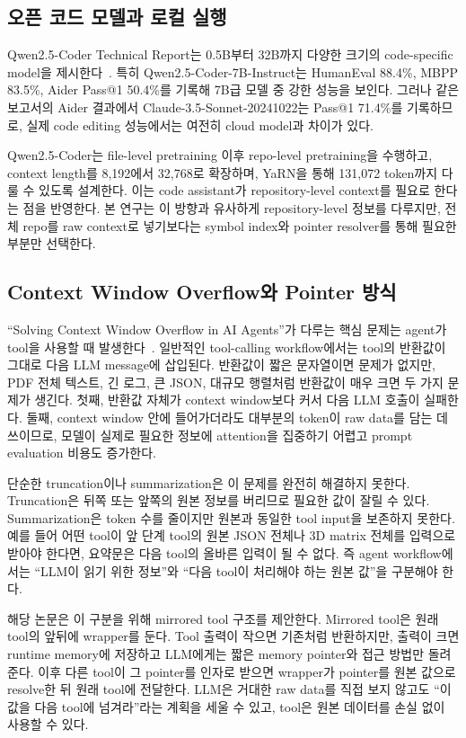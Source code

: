 \documentclass[11pt,a4paper]{article}
\begin{document}
\subsection{오픈 코드 모델과 로컬 실행}

Qwen2.5-Coder Technical Report는 0.5B부터 32B까지 다양한 크기의 code-specific model을 제시한다~\cite{hui2024qwen25coder}. 특히 Qwen2.5-Coder-7B-Instruct는 HumanEval 88.4\%, MBPP 83.5\%, Aider Pass@1 50.4\%를 기록해 7B급 모델 중 강한 성능을 보인다. 그러나 같은 보고서의 Aider 결과에서 Claude-3.5-Sonnet-20241022는 Pass@1 71.4\%를 기록하므로, 실제 code editing 성능에서는 여전히 cloud model과 차이가 있다.

Qwen2.5-Coder는 file-level pretraining 이후 repo-level pretraining을 수행하고, context length를 8,192에서 32,768로 확장하며, YaRN을 통해 131,072 token까지 다룰 수 있도록 설계한다. 이는 code assistant가 repository-level context를 필요로 한다는 점을 반영한다. 본 연구는 이 방향과 유사하게 repository-level 정보를 다루지만, 전체 repo를 raw context로 넣기보다는 symbol index와 pointer resolver를 통해 필요한 부분만 선택한다.

\subsection{Context Window Overflow와 Pointer 방식}

``Solving Context Window Overflow in AI Agents''가 다루는 핵심 문제는 agent가 tool을 사용할 때 발생한다~\cite{labate2025contextoverflow}. 일반적인 tool-calling workflow에서는 tool의 반환값이 그대로 다음 LLM message에 삽입된다. 반환값이 짧은 문자열이면 문제가 없지만, PDF 전체 텍스트, 긴 로그, 큰 JSON, 대규모 행렬처럼 반환값이 매우 크면 두 가지 문제가 생긴다. 첫째, 반환값 자체가 context window보다 커서 다음 LLM 호출이 실패한다. 둘째, context window 안에 들어가더라도 대부분의 token이 raw data를 담는 데 쓰이므로, 모델이 실제로 필요한 정보에 attention을 집중하기 어렵고 prompt evaluation 비용도 증가한다.

단순한 truncation이나 summarization은 이 문제를 완전히 해결하지 못한다. Truncation은 뒤쪽 또는 앞쪽의 원본 정보를 버리므로 필요한 값이 잘릴 수 있다. Summarization은 token 수를 줄이지만 원본과 동일한 tool input을 보존하지 못한다. 예를 들어 어떤 tool이 앞 단계 tool의 원본 JSON 전체나 3D matrix 전체를 입력으로 받아야 한다면, 요약문은 다음 tool의 올바른 입력이 될 수 없다. 즉 agent workflow에서는 ``LLM이 읽기 위한 정보''와 ``다음 tool이 처리해야 하는 원본 값''을 구분해야 한다.

해당 논문은 이 구분을 위해 mirrored tool 구조를 제안한다. Mirrored tool은 원래 tool의 앞뒤에 wrapper를 둔다. Tool 출력이 작으면 기존처럼 반환하지만, 출력이 크면 runtime memory에 저장하고 LLM에게는 짧은 memory pointer와 접근 방법만 돌려준다. 이후 다른 tool이 그 pointer를 인자로 받으면 wrapper가 pointer를 원본 값으로 resolve한 뒤 원래 tool에 전달한다. LLM은 거대한 raw data를 직접 보지 않고도 ``이 값을 다음 tool에 넘겨라''라는 계획을 세울 수 있고, tool은 원본 데이터를 손실 없이 사용할 수 있다.
\end{document}
